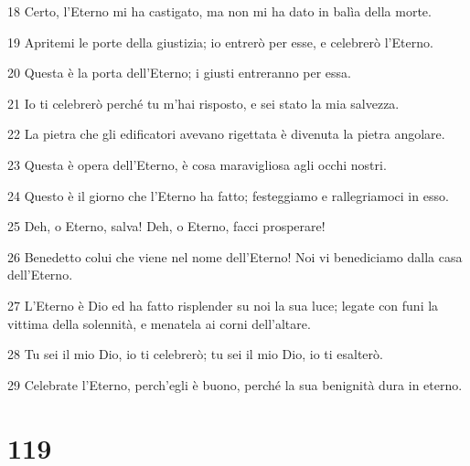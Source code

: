 \par 18 Certo, l'Eterno mi ha castigato, ma non mi ha dato in balìa della morte.
\par 19 Apritemi le porte della giustizia; io entrerò per esse, e celebrerò l'Eterno.
\par 20 Questa è la porta dell'Eterno; i giusti entreranno per essa.
\par 21 Io ti celebrerò perché tu m'hai risposto, e sei stato la mia salvezza.
\par 22 La pietra che gli edificatori avevano rigettata è divenuta la pietra angolare.
\par 23 Questa è opera dell'Eterno, è cosa maravigliosa agli occhi nostri.
\par 24 Questo è il giorno che l'Eterno ha fatto; festeggiamo e rallegriamoci in esso.
\par 25 Deh, o Eterno, salva! Deh, o Eterno, facci prosperare!
\par 26 Benedetto colui che viene nel nome dell'Eterno! Noi vi benediciamo dalla casa dell'Eterno.
\par 27 L'Eterno è Dio ed ha fatto risplender su noi la sua luce; legate con funi la vittima della solennità, e menatela ai corni dell'altare.
\par 28 Tu sei il mio Dio, io ti celebrerò; tu sei il mio Dio, io ti esalterò.
\par 29 Celebrate l'Eterno, perch'egli è buono, perché la sua benignità dura in eterno.

\chapter{119}

